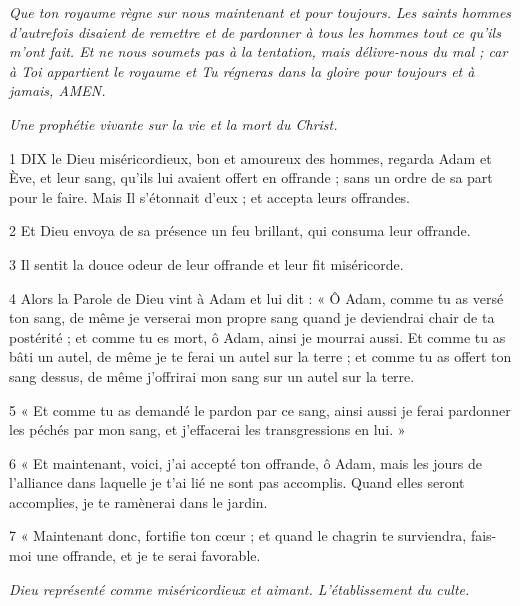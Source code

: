 \par \textit{Que ton royaume règne sur nous maintenant et pour toujours. Les saints hommes d’autrefois disaient de remettre et de pardonner à tous les hommes tout ce qu’ils m’ont fait. Et ne nous soumets pas à la tentation, mais délivre-nous du mal ; car à Toi appartient le royaume et Tu régneras dans la gloire pour toujours et à jamais, AMEN.}


\par \textit{Une prophétie vivante sur la vie et la mort du Christ.}

\par 1 DIX le Dieu miséricordieux, bon et amoureux des hommes, regarda Adam et Ève, et leur sang, qu'ils lui avaient offert en offrande ; sans un ordre de sa part pour le faire. Mais Il s’étonnait d’eux ; et accepta leurs offrandes.

\par 2 Et Dieu envoya de sa présence un feu brillant, qui consuma leur offrande.

\par 3 Il sentit la douce odeur de leur offrande et leur fit miséricorde.

\par 4 Alors la Parole de Dieu vint à Adam et lui dit : « Ô Adam, comme tu as versé ton sang, de même je verserai mon propre sang quand je deviendrai chair de ta postérité ; et comme tu es mort, ô Adam, ainsi je mourrai aussi. Et comme tu as bâti un autel, de même je te ferai un autel sur la terre ; et comme tu as offert ton sang dessus, de même j'offrirai mon sang sur un autel sur la terre.

\par 5 « Et comme tu as demandé le pardon par ce sang, ainsi aussi je ferai pardonner les péchés par mon sang, et j'effacerai les transgressions en lui. »

\par 6 « Et maintenant, voici, j'ai accepté ton offrande, ô Adam, mais les jours de l'alliance dans laquelle je t'ai lié ne sont pas accomplis. Quand elles seront accomplies, je te ramènerai dans le jardin.

\par 7 « Maintenant donc, fortifie ton cœur ; et quand le chagrin te surviendra, fais-moi une offrande, et je te serai favorable.


\par \textit{Dieu représenté comme miséricordieux et aimant. L'établissement du culte.}

